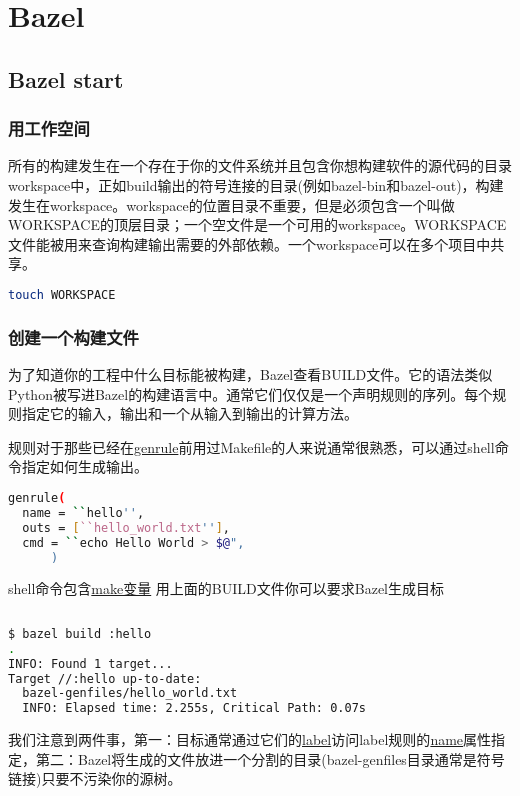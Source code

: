 \chapter{Bazel}
\section{Bazel start}
\subsection{用工作空间}
所有的构建发生在一个存在于你的文件系统并且包含你想构建软件的源代码的目录workspace中，正如build输出的符号连接的目录(例如bazel-bin和bazel-out)，构建发生在workspace。workspace的位置目录不重要，但是必须包含一个叫做WORKSPACE的顶层目录；一个空文件是一个可用的workspace。WORKSPACE文件能被用来查询构建输出需要的外部依赖。一个workspace可以在多个项目中共享。
\begin{lstlisting}[language=Bash]
touch WORKSPACE
\end{lstlisting}
\subsection{创建一个构建文件}
为了知道你的工程中什么目标能被构建，Bazel查看BUILD文件。它的语法类似Python被写进Bazel的构建语言中。通常它们仅仅是一个声明规则的序列。每个规则指定它的输入，输出和一个从输入到输出的计算方法。

规则对于那些已经在\href{https://docs.bazel.build/versions/master/be/general.html#genrule}{genrule}前用过Makefile的人来说通常很熟悉，可以通过shell命令指定如何生成输出。
\begin{lstlisting}[language=Bash]
genrule(
  name = ``hello'',
  outs = [``hello_world.txt''],
  cmd = ``echo Hello World > $@",
      )
\end{lstlisting}
shell命令包含\href{https://docs.bazel.build/versions/master/be/make-variables.html}{make变量}
用上面的BUILD文件你可以要求Bazel生成目标
\begin{lstlisting}[language=Bash]
\end{lstlisting}
\begin{lstlisting}[language=Bash]
$ bazel build :hello
.
INFO: Found 1 target...
Target //:hello up-to-date:
  bazel-genfiles/hello_world.txt
  INFO: Elapsed time: 2.255s, Critical Path: 0.07s
\end{lstlisting}
我们注意到两件事，第一：目标通常通过它们的\href{https://docs.bazel.build/versions/master/build-ref.html#labels}{label}访问label规则的\href{https://docs.bazel.build/versions/master/be/general.html#genrule.name}{name}属性指定，第二：Bazel将生成的文件放进一个分割的目录(bazel-genfiles目录通常是符号链接)只要不污染你的源树。

